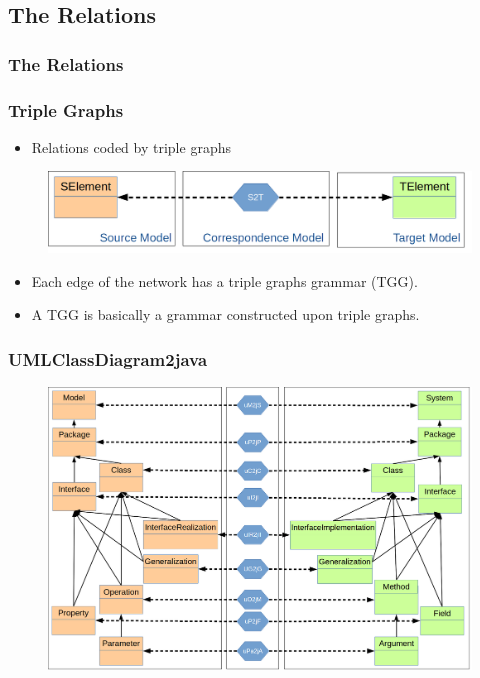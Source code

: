 \documentclass{beamer}
\begin{document}
\subsection{The Relations}
\begin{frame}
	\frametitle{The Relations}
\end{frame}

\begin{frame}
	\frametitle{Triple Graphs}
	\nocite{hermann2011correctness}
	\begin{itemize}
		\item Relations coded by triple graphs
	\end{itemize}
	\begin{figure}
		\includegraphics[width=.7\textwidth]{tripleGraphs}
	\end{figure}
	\pause
	\begin{itemize}
		\item Each edge of the network has a triple graphs grammar (TGG).
		\item A TGG is basically a grammar constructed upon triple graphs.
	\end{itemize}
\end{frame}

\begin{frame}
	\frametitle{UMLClassDiagram2java}
	\begin{figure}
		\includegraphics[width=.8\textwidth]{umlClassDiagram2java_type}
	\end{figure}
\end{frame}
\end{document}
